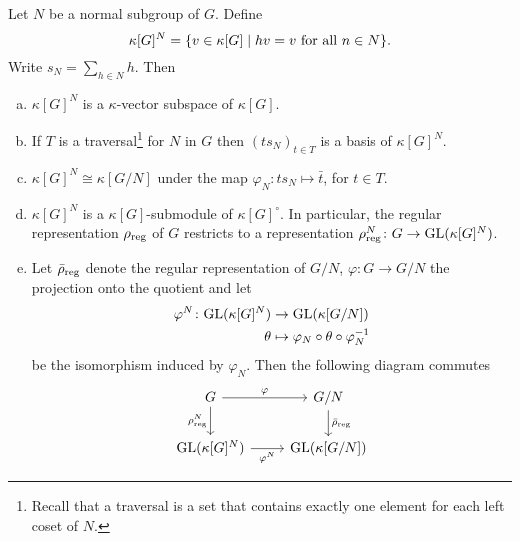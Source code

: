 \begin{prop}\label{prop:regular-representation-quotient}
    Let\/ $N$ be a normal subgroup of\/ $G$. Define
    $$
        \kappa[G]^N = \set{v\in\kappa[G]\mid hv=v\text{\rm\ for all }n\in N}.
    $$
    Write\/ $s_N=\sum_{h\in N}h$. Then
    \begin{enumerate}[a),font=\upshape]
        \item $\kappa[G]^N$ is a\/ $\kappa$-vector subspace of\/ $\kappa[G]$.

        \item If\/ $T$ is a traversal\/\footnote{Recall that a traversal is a set that contains exactly one element for each left coset of\/ $N$.} for\/ $N$ in\/ $G$ then\/ $(ts_N)_{t\in T}$ is a basis of\/ $\kappa[G]^N$.

        \item $\kappa[G]^N\cong\kappa[G/N]$ under the map\/ $\varphi_N\colon ts_N\mapsto\bar t$, for\/ $t\in T$.

        \item $\kappa[G]^N$ is a\/ $\kappa[G]$-submodule of\/ $\kappa[G]^\circ$. In particular, the regular representation\/ $\rrho$ of\/ $G$ restricts to a representation\/ $\rrho[\rho^N]\colon G\to\Aut(\kappa[G]^N)$.

        \item Let\/ $\rrho[\bar\rho]$ denote the regular representation of\/ $G/N$, $\varphi\colon G\to G/N$ the projection onto the quotient and let
        \begin{align*}
            \varphi^N\colon\Aut(\kappa[G]^N)&\to
                \Aut(\kappa[G/N])\\
            \theta&\mapsto
                \varphi_N\circ\theta\circ\varphi_N^{-1}
        \end{align*}
        be the isomorphism induced by $\varphi_N$. Then the following diagram commutes 
        $$
            \begin{tikzcd}
                G
                        \arrow[r,"\varphi"]
                        \arrow[d,"{\rrho[\rho^N]}"']
                    &G/N
                        \arrow[d,"{\rrho[\bar\rho]}"]\\
                {\Aut(\kappa[G]^N)}
                        \arrow[r,"\varphi^N"']
                    &{\Aut(\kappa[G/N])}
            \end{tikzcd}
        $$
    \end{enumerate}
\end{prop}


